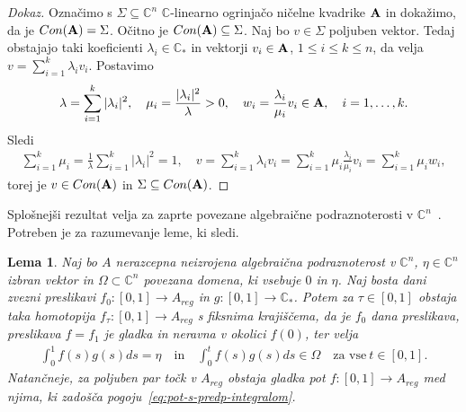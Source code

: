 \documentclass[12pt,a4paper,twoside]{article}
\theoremstyle{definition} %
\newenvironment{dokaz}[1][Dokaz]{\begin{proof}[#1]}{\end{proof}}
\theoremstyle{plain} %
\newtheorem{lema}[definicija]{Lema}
\numberwithin{equation}{section}  %
\newcommand{\C}{\mathbb C}
\begin{document}
\begin{dokaz}
Označimo s $\Sigma \subseteq \C^{n}$ $\C$-linearno ogrinjačo ničelne kvadrike $\textup{\textbf{A}}$ in dokažimo, da je $Con(\textup{\textbf{A}}) = \Sigma$. \newline
Očitno je $Con(\textup{\textbf{A}}) \subseteq \Sigma$. \newline
Naj bo $v \in \Sigma$ poljuben vektor. Tedaj obstajajo taki koeficienti $\lambda_{i} \in \C_{*}$ in vektorji $v_{i} \in \textup{\textbf{A}}$, $1 \leq i \leq k \leq n$, da velja $v = \sum_{i=1}^{k} \lambda_{i} v_{i}$.
Postavimo
\begin{gather*}
\lambda = \sum_{i=1}^{k} |\lambda_{i}|^2, \quad \mu_{i} = \frac{|\lambda_{i}|^2}{\lambda} > 0, \quad w_{i}=\frac{\lambda_{i}}{\mu_{i}}v_{i} \in \textup{\textbf{A}}, \quad i=1, \dots, k.
\end{gather*}
Sledi
\begin{gather*}
\sum_{i=1}^{k} \mu_{i} = \frac{1}{\lambda} \sum_{i=1}^{k} |\lambda_{i}|^2 = 1, \quad v = \sum_{i=1}^{k} \lambda_{i}v_{i} =  \sum_{i=1}^{k} \mu_{i}\frac{\lambda_{i}}{\mu_{i}} v_{i} =  \sum_{i=1}^{k} \mu_{i}w_{i},
\end{gather*}
torej je $v \in Con(\textup{\textbf{A}})$ in $\Sigma \subseteq Con(\textup{\textbf{A}})$.
\end{dokaz}

Splošnejši rezultat velja za zaprte povezane algebraične podraznoterosti v $\C^{n}$~\cite[Lemma~3.5.1]{alarcon2021minimal}. Potreben je za razumevanje leme, ki sledi.

\begin{lema} \label{lema:analog-gromova}
Naj bo $A$ nerazcepna neizrojena algebraična podraznoterost v $\mathbb{C}^{n}$, $\eta \in \mathbb{C}^{n}$ izbran vektor in $\Omega \subset \mathbb{C}^{n}$ povezana domena, ki vsebuje $0$ in $\eta$. 
Naj bosta dani zvezni preslikavi $f_0 \colon [0,1] \to A_{reg}$ in $g \colon [0,1] \to \mathbb{C}_{*}$.
Potem za $\tau \in [0,1]$ obstaja taka homotopija $f_{\tau} \colon [0,1] \to A_{reg}$ s fiksnima krajiščema, da je $f_0$ dana preslikava, preslikava $f = f_1$ je gladka in neravna v okolici $f(0)$, ter velja
\begin{gather} \label{eq:pot-s-predp-integralom}
\int_{0}^{1} f(s)g(s)ds = \eta \quad \textrm{in} \quad \int_{0}^{t} f(s)g(s)ds \in \Omega \quad \textrm{za vse} \ t \in [0,1].
\end{gather}
Natančneje, za poljuben par točk v $A_{reg}$ obstaja gladka pot $f \colon [0,1] \to A_{reg}$ med njima, ki zadošča pogoju~\eqref{eq:pot-s-predp-integralom}.
\end{lema}
\end{document}
